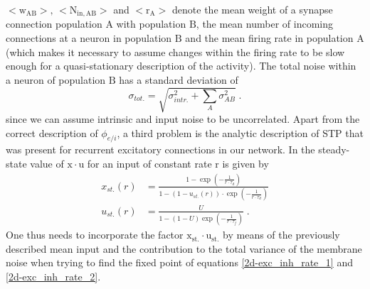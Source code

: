 \documentclass[10pt,a4paper]{article}
\begin{document}
$\mathrm{<w_{AB}>,\, <N_{in,AB}>}$ and $\mathrm{<r_A>}$ denote the mean weight of a synapse connection population $\mathrm{A}$ with population $\mathrm{B}$, the mean number of incoming connections at a neuron in population $\mathrm{B}$ and the mean firing rate in population $\mathrm{A}$ (which makes it necessary to assume changes within the firing rate to be slow enough for a quasi-stationary description of the activity).
The total noise within a neuron of population $\mathrm{B}$ has a standard deviation of 
\begin{equation}
\sigma_{tot.} = \sqrt{\sigma_{intr.}^2 + \sum_A \sigma_{AB}^2} \; .
\label{Total_Noise_Neuron}
\end{equation}
since we can assume intrinsic and input noise to be uncorrelated. Apart from the correct description of $\phi_{e/i}$, a third problem is the analytic description of STP that was present for recurrent excitatory connections in our network. In \cite{Markram_STP} the steady-state value of $\mathrm{x\cdot u}$ for an input of constant rate $\mathrm{r}$ is given by
\begin{align}
x_{st.}(r) &= \frac{1-\exp \left(-\frac{1}{r\cdot \tau _d}\right)}{1-\left(1-u_{st.}\left(r\right)\right)\cdot \exp \left(-\frac{1}{r\cdot \tau _d}\right)} \label{STP_steady1} \\
u_{st.}(r) &= \frac{U}{1-\left(1-U\right)\exp \left(-\frac{1}{r\cdot \tau _f}\right)} \; .\label{STP_steady2}
\end{align}
One thus needs to incorporate the factor $\mathrm{x_{st.}\cdot u_{st.}}$ by means of the previously described mean input and the contribution to the total variance of the membrane noise when trying to find the fixed point of equations \ref{2d-exc_inh_rate_1} and \ref{2d-exc_inh_rate_2}.
 
\end{document}
